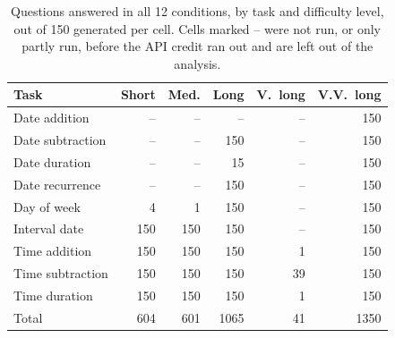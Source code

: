 \begin{table}[t]
\centering
\small
\setlength{\tabcolsep}{3.5pt}
\begin{tabular}{@{}lrrrrr@{}}
\toprule
Task & Short & Med. & Long & V.\ long & V.V.\ long \\
\midrule
Date addition & -- & -- & -- & -- & 150 \\
Date subtraction & -- & -- & 150 & -- & 150 \\
Date duration & -- & -- & 15 & -- & 150 \\
Date recurrence & -- & -- & 150 & -- & 150 \\
Day of week & 4 & 1 & 150 & -- & 150 \\
Interval date & 150 & 150 & 150 & -- & 150 \\
Time addition & 150 & 150 & 150 & 1 & 150 \\
Time subtraction & 150 & 150 & 150 & 39 & 150 \\
Time duration & 150 & 150 & 150 & 1 & 150 \\
\midrule
Total & 604 & 601 & 1065 & 41 & 1350 \\
\bottomrule
\end{tabular}
\caption{Questions answered in all 12 conditions, by task and difficulty level, out of 150 generated per cell. Cells marked -- were not run, or only partly run, before the API credit ran out and are left out of the analysis.}
\label{tab:coverage}
\end{table}
